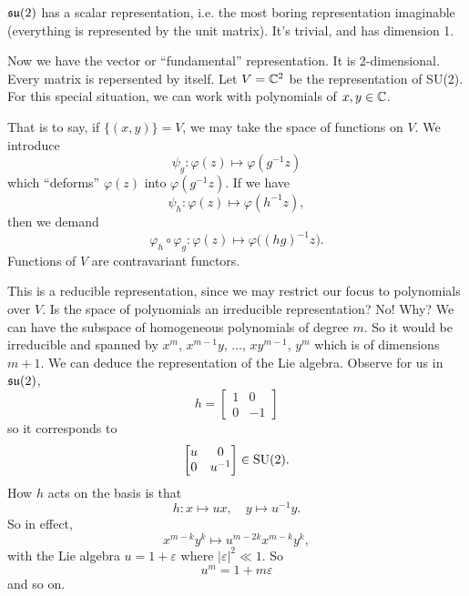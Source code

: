 \begin{rmk}
$\frak{su}(2)$ has a scalar representation, i.e. the most boring
  representation imaginable (everything is represented by the
  unit matrix). It's trivial, and has dimension 1.
\end{rmk}

Now we have the vector or ``fundamental'' representation. It is
2-dimensional. Every matrix is repersented by itself. Let
$V=\Bbb{C}^{2}$ be the representation of SU(2). For this special
situation, we can work with polynomials of $x,y\in\Bbb{C}$.

That is to say, if $\{(x,y)\}=V$, we may take the space of
functions on $V$. We introduce
\begin{equation}
\psi_{g}\colon\varphi(z)\mapsto\varphi(g^{-1}z)
\end{equation}
which ``deforms'' $\varphi(z)$ into $\varphi(g^{-1}z)$. If we
have
\begin{equation}
\psi_{h}\colon\varphi(z)\mapsto\varphi(h^{-1}z),
\end{equation}
then we demand
\begin{equation}
\varphi_{h}\circ\varphi_{g}\colon\varphi(z)\mapsto\varphi\big((hg)^{-1}z\big).
\end{equation}
Functions of $V$ are contravariant functors.

This is a reducible representation, since we may restrict our
focus to polynomials over $V$. Is the space of polynomials an
irreducible representation? No! Why? We can have the subspace of
homogeneous polynomials of degree $m$. So it would be irreducible
and spanned by $x^{m}$, $x^{m-1}y$, ..., $xy^{m-1}$, $y^{m}$
which is of dimensions $m+1$. We can deduce the representation of
the Lie algebra. Observe for us in $\frak{su}(2)$,
\begin{equation}
h=\begin{bmatrix}
1 & 0\\
0 & -1
\end{bmatrix}
\end{equation}
so it corresponds to
\begin{equation}
\begin{bmatrix}
u & 0\\
0 & u^{-1}
\end{bmatrix}\in{\rm SU}(2).
\end{equation}
How $h$ acts on the basis is that
\begin{equation}
h\colon x\mapsto ux,\quad y\mapsto u^{-1}y.
\end{equation}
So in effect,
\begin{equation}
x^{m-k}y^{k}\mapsto u^{m-2k}x^{m-k}y^{k},
\end{equation}
with the Lie algebra $u=1+\varepsilon$ where
$|\varepsilon|^{2}\ll1$. So 
\begin{equation}
u^{m}=1+m\varepsilon
\end{equation}
and so on.
